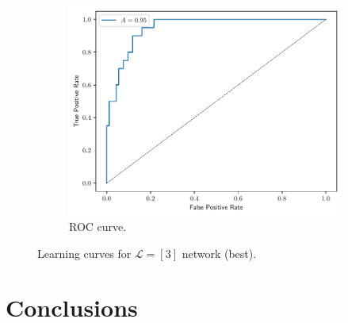 \documentclass[conference]{IEEEtran}
\theoremstyle{definition}
\theoremstyle{remark}
\theoremstyle{remark}
\begin{document}
\begin{figure}
\begin{subfigure}[b]{0.32\textwidth}
        \includegraphics[width=\textwidth]{figs/3-0.9-roc.pdf}
        \caption{ROC curve.}
    \end{subfigure}
    \caption{Learning curves for $\mathcal{L}=[3]$ network (best).}
    \label{fig:NN-best}
\end{figure}

\section{Conclusions}\label{sec:conc}

\printbibliography
\end{document}
